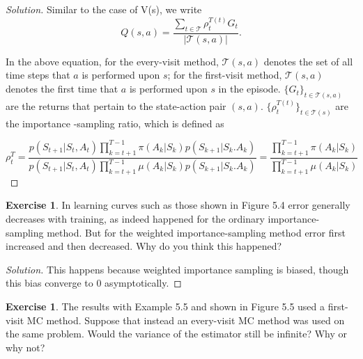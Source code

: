 \documentclass[oneside,11pt]{article}
\theoremstyle{definition}
\newtheorem{exer}[thm]{Exercise}
\newcommand{\Tcal}{\mathcal{T}}
\newenvironment{solution}
{\renewcommand\qedsymbol{$\blacksquare$}\begin{proof}[Solution]} {\end{proof}}
\begin{document}
\begin{shaded}
\begin{solution} 
Similar to the case of V(s), we write
\[Q(s,a) = \frac{\sum_{t \in \mathcal{T}} \rho_t^{T(t)}G_t}{|\mathcal{T}(s,a)|}. \] 

In the above equation, for the every-visit method, $\Tcal(s,a)$ denotes the set of all time steps that $a$ is performed upon $s$; for the first-visit method, $\Tcal(s,a)$ denotes the first time that $a$ is performed upon $s$ in the episode. $ \{ G_t \}_{t \in \Tcal(s,a)}$ are the returns that pertain to the state-action pair $(s,a)$. $\{ \rho_t^{T(t)} \}_{t \in \Tcal(s)}$ are the importance -sampling ratio, which is defined as 

\[\rho_t^T = \frac{p(S_{t+1}|S_t, A_t) \prod_{k=t+1}^{T-1} \pi(A_k|S_k)p(S_{k+1} | S_k. A_k)}{p(S_{t+1}|S_t, A_t) \prod_{k=t+1}^{T-1} \mu(A_k|S_k)p(S_{k+1} | S_k. A_k)} =  \frac{ \prod_{k=t+1}^{T-1} \pi(A_k|S_k)}{ \prod_{k=t+1}^{T-1} \mu(A_k|S_k)} \]

\end{solution} 
\end{shaded}



\begin{exer}
In learning curves such as those shown in Figure 5.4 error generally decreases with training, as indeed happened for the ordinary importance-sampling method. But for the weighted importance-sampling method error first increased and then decreased. Why do you think this happened?
\end{exer}


\begin{shaded}
\begin{solution} 
This happens because weighted importance sampling is biased, though this bias converge to 0 asymptotically. 

\end{solution} 
\end{shaded}



\begin{exer}
The results with Example 5.5 and shown in Figure 5.5 used a first- visit MC method. Suppose that instead an every-visit MC method was used on the same problem. Would the variance of the estimator still be infinite? Why or why not?
\end{exer}
\end{document}
